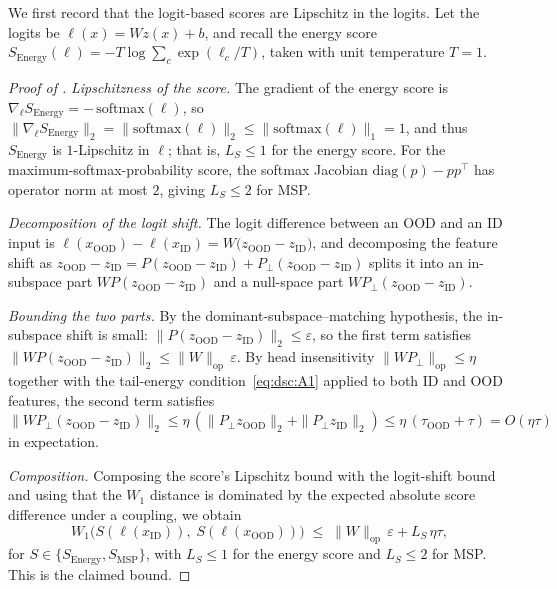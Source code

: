 We first record that the logit-based scores are Lipschitz in the logits. Let the
logits be $\ell(x) = W z(x) + b$, and recall the energy score
$S_{\mathrm{Energy}}(\ell) = -T \log \sum_c \exp(\ell_c / T)$, taken with unit
temperature $T = 1$.

\begin{proof}[Proof of ]
\emph{Lipschitzness of the score.}
The gradient of the energy score is
$\nabla_\ell S_{\mathrm{Energy}} = -\,\mathrm{softmax}(\ell)$, so
$\|\nabla_\ell S_{\mathrm{Energy}}\|_2 = \|\mathrm{softmax}(\ell)\|_2 \le \|\mathrm{softmax}(\ell)\|_1 = 1$,
and thus $S_{\mathrm{Energy}}$ is $1$-Lipschitz in $\ell$; that is,
$L_S \le 1$ for the energy score. For the maximum-softmax-probability score, the
softmax Jacobian $\mathrm{diag}(p) - p p^\top$ has operator norm at most $2$,
giving $L_S \le 2$ for MSP.

\emph{Decomposition of the logit shift.}
The logit difference between an OOD and an ID input is
$\ell(x_{\mathrm{OOD}}) - \ell(x_{\mathrm{ID}}) = W\bigl(z_{\mathrm{OOD}} - z_{\mathrm{ID}}\bigr)$,
and decomposing the feature shift as
$z_{\mathrm{OOD}} - z_{\mathrm{ID}} = P(z_{\mathrm{OOD}} - z_{\mathrm{ID}}) + P_\perp(z_{\mathrm{OOD}} - z_{\mathrm{ID}})$
splits it into an in-subspace part $W P(z_{\mathrm{OOD}} - z_{\mathrm{ID}})$ and
a null-space part $W P_\perp(z_{\mathrm{OOD}} - z_{\mathrm{ID}})$.

\emph{Bounding the two parts.}
By the dominant-subspace--matching hypothesis, the in-subspace shift is small:
$\|P(z_{\mathrm{OOD}} - z_{\mathrm{ID}})\|_2 \le \varepsilon$, so the first term
satisfies
$\|W P(z_{\mathrm{OOD}} - z_{\mathrm{ID}})\|_2 \le \|W\|_{\mathrm{op}}\,\varepsilon$.
By head insensitivity $\|W P_\perp\|_{\mathrm{op}} \le \eta$ together with the
tail-energy condition~\eqref{eq:dsc:A1} applied to both ID and OOD features, the
second term satisfies
$\|W P_\perp(z_{\mathrm{OOD}} - z_{\mathrm{ID}})\|_2 \le \eta\,(\|P_\perp z_{\mathrm{OOD}}\|_2 + \|P_\perp z_{\mathrm{ID}}\|_2) \le \eta\,(\tau_{\mathrm{OOD}} + \tau) = O(\eta\tau)$
in expectation.

\emph{Composition.}
Composing the score's Lipschitz bound with the logit-shift bound and using that
the $W_1$ distance is dominated by the expected absolute score difference under
a coupling, we obtain
\begin{equation} W_1\!\bigl(S(\ell(x_{\mathrm{ID}})),\; S(\ell(x_{\mathrm{OOD}}))\bigr) \;\le\; \|W\|_{\mathrm{op}}\,\varepsilon + L_S\,\eta\tau , \label{eq:dsc:logit-fail} \end{equation}
for $S \in \{S_{\mathrm{Energy}}, S_{\mathrm{MSP}}\}$, with $L_S \le 1$ for the
energy score and $L_S \le 2$ for MSP. This is the claimed bound.
\end{proof}

